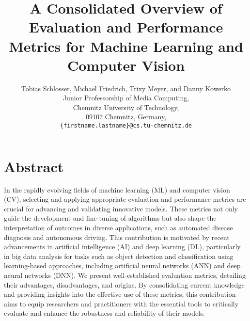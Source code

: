 \documentclass{article}
\newcommand{\ORCID}[1]{\textsuperscript{\href{https://orcid.org/#1}{\textcolor[HTML]{A6CE39}{\faOrcid}}}}
\newcommand{\ORCIDSchlosser}{0000-0002-0682-4284} %
\newcommand{\ORCIDFriedrich}{0000-0001-6326-4749} %
\newcommand{\ORCIDMeyer}{0000-0002-3372-1619}     %
\newcommand{\ORCIDKowerko}{0000-0002-4538-7814}   %
\begin{document}
\title{\Huge A Consolidated Overview of Evaluation and Performance Metrics for Machine Learning and Computer Vision}

\author{
    Tobias Schlosser\ORCID{\ORCIDSchlosser}, Michael Friedrich\ORCID{\ORCIDFriedrich}, Trixy Meyer\ORCID{\ORCIDMeyer}, and Danny Kowerko\ORCID{\ORCIDKowerko} \\[1ex]
    Junior Professorship of Media Computing, \\
    Chemnitz University of Technology, \\
    09107 Chemnitz, Germany, \\
    \texttt{\{firstname.lastname\}@cs.tu-chemnitz.de}
}




\maketitle




\section*{Abstract}

In the rapidly evolving fields of machine learning (ML) and computer vision (CV), selecting and applying appropriate evaluation and performance metrics are crucial for advancing and validating innovative models. These metrics not only guide the development and fine-tuning of algorithms but also shape the interpretation of outcomes in diverse applications, such as automated disease diagnosis and autonomous driving. This contribution is motivated by recent advancements in artificial intelligence (AI) and deep learning (DL), particularly in big data analysis for tasks such as object detection and classification using learning-based approaches, including artificial neural networks (ANN) and deep neural networks (DNN). We present well-established evaluation metrics, detailing their advantages, disadvantages, and origins. By consolidating current knowledge and providing insights into the effective use of these metrics, this contribution aims to equip researchers and practitioners with the essential tools to critically evaluate and enhance the robustness and reliability of their models.
\end{document}
